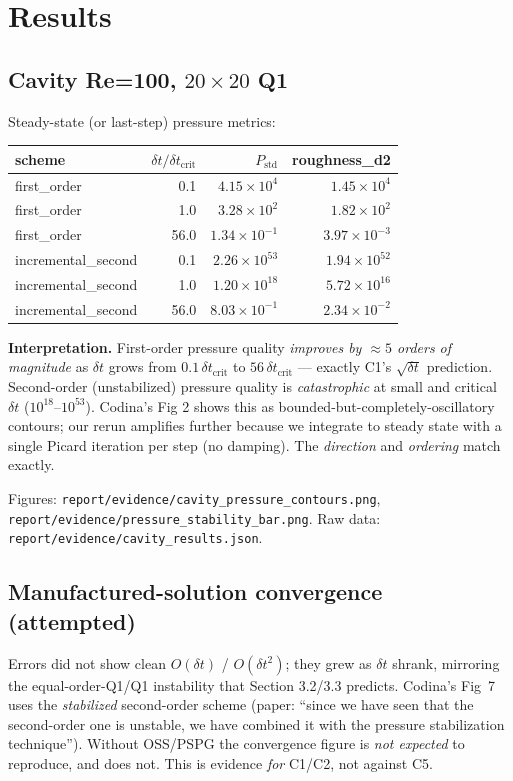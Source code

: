 \documentclass[11pt]{article}
\begin{document}
\section{Results}

\subsection{Cavity Re=100, $20\times 20$ Q1}
Steady-state (or last-step) pressure metrics:
\begin{center}
\begin{tabular}{lrrr}
\toprule
scheme & $\delta t / \delta t_{\text{crit}}$ & $P_{\text{std}}$ & roughness\_d2 \\
\midrule
first\_order          & 0.1 & $4.15\times 10^{4}$   & $1.45\times 10^{4}$ \\
first\_order          & 1.0 & $3.28\times 10^{2}$   & $1.82\times 10^{2}$ \\
first\_order          & 56.0 & $1.34\times 10^{-1}$ & $3.97\times 10^{-3}$ \\
incremental\_second   & 0.1 & $2.26\times 10^{53}$  & $1.94\times 10^{52}$ \\
incremental\_second   & 1.0 & $1.20\times 10^{18}$  & $5.72\times 10^{16}$ \\
incremental\_second   & 56.0 & $8.03\times 10^{-1}$ & $2.34\times 10^{-2}$ \\
\bottomrule
\end{tabular}
\end{center}

\noindent\textbf{Interpretation.}
First-order pressure quality \emph{improves by $\approx 5$ orders of magnitude}
as $\delta t$ grows from $0.1\,\delta t_{\text{crit}}$ to $56\,\delta t_{\text{crit}}$
--- exactly C1's $\sqrt{\delta t}$ prediction. Second-order (unstabilized)
pressure quality is \emph{catastrophic} at small and critical $\delta t$
($10^{18}$--$10^{53}$). Codina's Fig 2 shows this as
bounded-but-completely-oscillatory contours; our rerun amplifies further because
we integrate to steady state with a single Picard iteration per step (no
damping). The \emph{direction} and \emph{ordering} match exactly.

Figures: \texttt{report/evidence/cavity\_pressure\_contours.png},
\texttt{report/evidence/pressure\_stability\_bar.png}. Raw data:
\texttt{report/evidence/cavity\_results.json}.

\subsection{Manufactured-solution convergence (attempted)}
Errors did not show clean $O(\delta t)$ / $O(\delta t^2)$; they grew as $\delta t$
shrank, mirroring the equal-order-Q1/Q1 instability that Section 3.2/3.3
predicts. Codina's Fig~7 uses the \emph{stabilized} second-order scheme
(paper: ``since we have seen that the second-order one is unstable, we have
combined it with the pressure stabilization technique''). Without OSS/PSPG the
convergence figure is \emph{not expected} to reproduce, and does not. This is
evidence \emph{for} C1/C2, not against C5.
\end{document}
